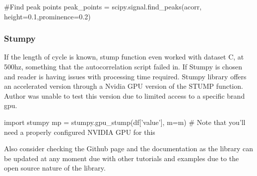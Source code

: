 \begin{python}
#Find peak points
peak_points = scipy.signal.find_peaks(acorr, height=0.1,prominence=0.2)
\end{python}

\subsubsection{Stumpy}
If the length of cycle is known, stump function even worked with dataset C, at 500hz, something that the autocorrelation script failed in.
If Stumpy is chosen and reader is having issues with processing time required. Stumpy library offers an accelerated version through a Nvidia GPU version of the STUMP function. Author was unable to test this version due to limited access to a specific brand gpu. 
\begin{python}
import stumpy
mp = stumpy.gpu_stump(df['value'], m=m)  
# Note that you'll need a properly configured NVIDIA GPU for this
\end{python}

Also consider checking the Github page and the documentation as the library can be updated at any moment due with other tutorials and examples due to the open source nature of the library. \cite{law2019stumpy}


